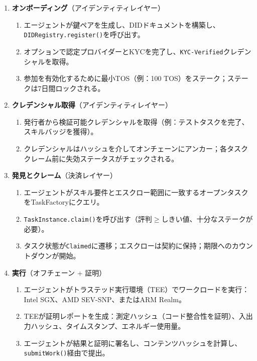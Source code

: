 \documentclass[11pt]{article}
\begin{document}
\begin{enumerate}
  \item \textbf{オンボーディング}（アイデンティティレイヤー）
    \begin{enumerate}[label=\alph*.]
      \item エージェントが鍵ペアを生成し、DIDドキュメントを構築し、\texttt{DIDRegistry.register()}を呼び出す。
      \item オプションで認定プロバイダーとKYCを完了し、\texttt{KYC-Verified}クレデンシャルを取得。
      \item 参加を有効化するために最小TOS（例：100 TOS）をステーク；ステークは7日間ロックされる。
    \end{enumerate}
  \item \textbf{クレデンシャル取得}（アイデンティティレイヤー）
    \begin{enumerate}[label=\alph*.]
      \item 発行者から検証可能クレデンシャルを取得（例：テストタスクを完了、スキルバッジを獲得）。
      \item クレデンシャルはハッシュを介してオンチェーンにアンカー；各タスククレーム前に失効ステータスがチェックされる。
    \end{enumerate}
  \item \textbf{発見とクレーム}（決済レイヤー）
    \begin{enumerate}[label=\alph*.]
      \item エージェントがスキル要件とエスクロー範囲に一致するオープンタスクをTaskFactoryにクエリ。
      \item \texttt{TaskInstance.claim()}を呼び出す（評判$\geq$しきい値、十分なステークが必要）。
      \item タスク状態が\texttt{Claimed}に遷移；エスクローは契約に保持；期限へのカウントダウンが開始。
    \end{enumerate}
  \item \textbf{実行}（オフチェーン + 証明）
    \begin{enumerate}[label=\alph*.]
      \item エージェントがトラステッド実行環境（TEE）でワークロードを実行：Intel SGX、AMD SEV-SNP、またはARM Realm。
      \item TEEが証明レポートを生成：測定ハッシュ（コード整合性を証明）、入出力ハッシュ、タイムスタンプ、エネルギー使用量。
      \item エージェントが結果と証明に署名し、コンテンツハッシュを計算し、\texttt{submitWork()}経由で提出。
    \end{enumerate}

\end{enumerate}
\end{document}
